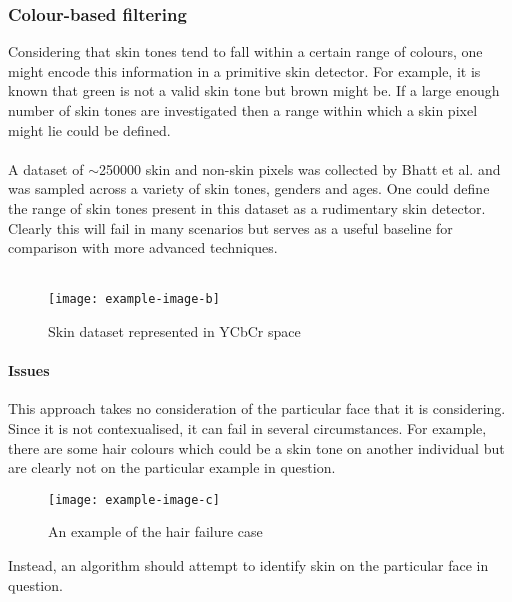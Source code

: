 \subsubsection{Colour-based filtering}
\label{section:colour-filter}
Considering that skin tones tend to fall within a certain range of colours, one might encode this information in a primitive skin detector. For example, it is known that green is not a valid skin tone but brown might be. If a large enough number of skin tones are investigated then a range within which a skin pixel might lie could be defined. 
\\ \\
A dataset of $\sim$250000 skin and non-skin pixels was collected by Bhatt et al. \cite{skinDataset} and was sampled across a variety of skin tones, genders and ages. One could define the range of skin tones present in this dataset as a rudimentary skin detector. Clearly this will fail in many scenarios but serves as a useful baseline for comparison with more advanced techniques.
\\ \\

\begin{figure}[!h]
    \texttt{[image: example-image-b]}
   \caption{Skin dataset represented in YCbCr space} 
\end{figure}
\paragraph{Issues}
This approach takes no consideration of the particular face that it is considering. Since it is not contexualised, it can fail in several circumstances.
For example, there are some hair colours which could be a skin tone on another individual but are clearly not on the particular example in question.
\begin{figure}[!h]
    \texttt{[image: example-image-c]}
   \caption{An example of the hair failure case} 
\end{figure}
Instead, an algorithm should attempt to identify skin on the particular face in question.

